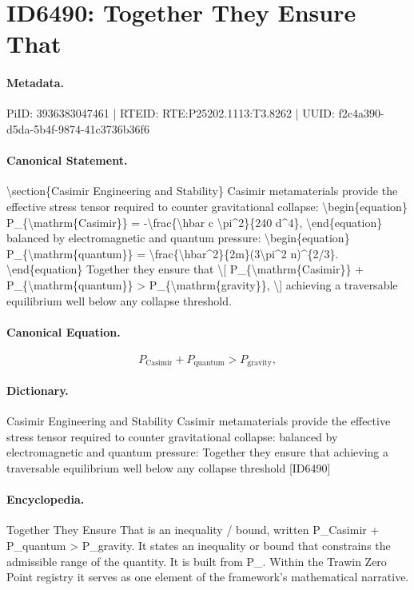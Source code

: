 \section*{ID6490: Together They Ensure That}
\paragraph{Metadata.}
PiID: 3936383047461 | RTEID: RTE:P25202.1113:T3.8262 | UUID: f2c4a390-d5da-5b4f-9874-41c3736b36f6

\paragraph{Canonical Statement.}
\textbackslash{}section\{Casimir Engineering and Stability\} Casimir metamaterials provide the effective stress tensor required to counter gravitational collapse: \textbackslash{}begin\{equation\} P\_\{\textbackslash{}mathrm\{Casimir\}\} = -\textbackslash{}frac\{\textbackslash{}hbar c \textbackslash{}pi\textasciicircum{}2\}\{240 d\textasciicircum{}4\}, \textbackslash{}end\{equation\} balanced by electromagnetic and quantum pressure: \textbackslash{}begin\{equation\} P\_\{\textbackslash{}mathrm\{quantum\}\} = \textbackslash{}frac\{\textbackslash{}hbar\textasciicircum{}2\}\{2m\}(3\textbackslash{}pi\textasciicircum{}2 n)\textasciicircum{}\{2/3\}. \textbackslash{}end\{equation\} Together they ensure that \textbackslash{}[ P\_\{\textbackslash{}mathrm\{Casimir\}\} + P\_\{\textbackslash{}mathrm\{quantum\}\} > P\_\{\textbackslash{}mathrm\{gravity\}\}, \textbackslash{}] achieving a traversable equilibrium well below any collapse threshold.

\paragraph{Canonical Equation.}
\[
P_{\mathrm{Casimir}} + P_{\mathrm{quantum}} > P_{\mathrm{gravity}},
\]

\paragraph{Dictionary.}
Casimir Engineering and Stability Casimir metamaterials provide the effective stress tensor required to counter gravitational collapse: balanced by electromagnetic and quantum pressure: Together they ensure that achieving a traversable equilibrium well below any collapse threshold [ID6490]

\paragraph{Encyclopedia.}
Together They Ensure That is an inequality / bound, written P\_Casimir + P\_quantum > P\_gravity. It states an inequality or bound that constrains the admissible range of the quantity. It is built from P\_. Within the Trawin Zero Point registry it serves as one element of the framework's mathematical narrative.
